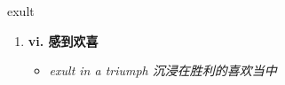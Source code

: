 
\begin{frame}
{\huge exult}
\begin{center}
\begin{enumerate}\Large
  \item \textbf{vi. 感到欢喜}
  \begin{itemize}
    \item \em{\Large{exult in a triumph 沉浸在胜利的喜欢当中}}
  \end{itemize}
\end{enumerate}
\end{center}
\end{frame}

